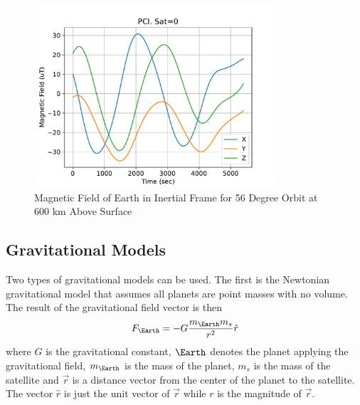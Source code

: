 \documentclass{article}
\begin{document}
\begin{figure}[H]
  \begin{center}
  \includegraphics[width=90mm]{Figures/Magnetic_Field_Orbit}
  \end{center}
  \caption{Magnetic Field of Earth in Inertial Frame for 56 Degree
    Orbit at 600 km Above Surface}\label{f:mag_orbit}
\end{figure}

\subsection{Gravitational Models}

Two types of gravitational models can be used. The first is the
Newtonian gravitational model that assumes all planets are point
masses with no volume. The result of the gravitational field vector is
then
\begin{equation}
  F_{\Earth} = -G\frac{m_{\Earth} m_s}{r^2}\hat{r}
\end{equation}
where $G$ is the gravitational constant, $\Earth$ denotes the planet
applying the gravitational field, $m_\Earth$ is the mass of the
planet, $m_s$ is the mass of the satellite and $\vec{r}$ is a distance
vector from the center of the planet to the satellite. The vector
$\hat{r}$ is just the unit vector of $\vec{r}$ while $r$ is the
magnitude of $\vec{r}$.
\end{document}
